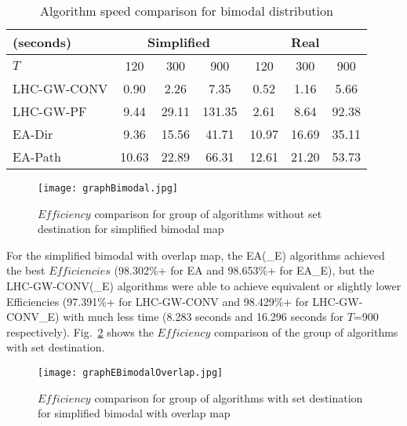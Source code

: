 \documentclass[letterpaper, 10 pt, conference]{ieeeconf}
\begin{document}
\begin{table}
	\centering
		\begin{tabular}
			{|l|c|c|c|c|c|c|}
			\hline
			(seconds) & \multicolumn{3}{|c|}{Simplified} & \multicolumn{3}{|c|}{Real} \\
			\hline
			$T$ & 120 & 300 & 900	& 120 & 300 & 900 \\
			\hline
			LHC-GW-CONV & 0.90 & 2.26 & 7.35 & 0.52 & 1.16 & 5.66 \\
			\hline
			LHC-GW-PF	& 9.44 & 29.11 & 131.35 & 2.61 & 8.64 & 92.38 \\
			\hline
			EA-Dir & 9.36 & 15.56 & 41.71 & 10.97 & 16.69 & 35.11 \\
			\hline
			EA-Path & 10.63 & 22.89 & 66.31 & 12.61 & 21.20 & 53.73 \\
			\hline
		\end{tabular}
\caption{Algorithm speed comparison for bimodal distribution}
\label{TBimodalSimplified}
\vspace*{-7ex}
\end{table}

\begin{figure}
\vspace*{-2ex}
\centering
\texttt{[image: graphBimodal.jpg]}
\caption{$\mathit{Efficiency}$ comparison for group of algorithms without set destination for simplified bimodal map}
\label{graphBimodal}
\vspace*{-2ex}
\end{figure}

For the simplified bimodal with overlap map, the EA(\_E) algorithms achieved the best $\mathit{Efficiencies}$ (98.302\%+ for EA and 98.653\%+ for EA\_E), but the LHC-GW-CONV(\_E) algorithms were able to achieve equivalent or slightly lower Efficiencies (97.391\%+ for LHC-GW-CONV and 98.429\%+ for LHC-GW-CONV\_E) with much less time (8.283 seconds and 16.296 seconds for $T$=900 respectively). Fig.~\ref{graphEBimodalOverlap} shows the $\mathit{Efficiency}$ comparison of the group of algorithms with set destination.

\begin{figure}
\centering
\texttt{[image: graphEBimodalOverlap.jpg]}
\caption{$\mathit{Efficiency}$ comparison for group of algorithms with set destination for simplified bimodal with overlap map}
\label{graphEBimodalOverlap}
\vspace*{-4ex}
\end{figure}
\end{document}
